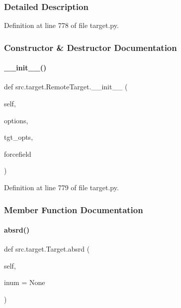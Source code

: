 \subsubsection{Detailed Description}


Definition at line 778 of file target.\+py.



\subsubsection{Constructor \& Destructor Documentation}
\mbox{\label{classsrc_1_1target_1_1RemoteTarget_acc35e5f8e76fa6a54149ff0c930acd6c}} 
\paragraph{\texorpdfstring{\+\_\+\+\_\+init\+\_\+\+\_\+()}{\_\_init\_\_()}}
{\footnotesize\ttfamily def src.\+target.\+Remote\+Target.\+\_\+\+\_\+init\+\_\+\+\_\+ (\begin{DoxyParamCaption}\item[{}]{self,  }\item[{}]{options,  }\item[{}]{tgt\+\_\+opts,  }\item[{}]{forcefield }\end{DoxyParamCaption})}



Definition at line 779 of file target.\+py.



\subsubsection{Member Function Documentation}
\mbox{\label{classsrc_1_1target_1_1Target_ad4a6e0bee35444a8b2c8bc124aac3c46}} 
\paragraph{\texorpdfstring{absrd()}{absrd()}}
{\footnotesize\ttfamily def src.\+target.\+Target.\+absrd (\begin{DoxyParamCaption}\item[{}]{self,  }\item[{}]{inum = {\ttfamily None} }\end{DoxyParamCaption})\hspace{0.3cm}{\ttfamily [inherited]}}



